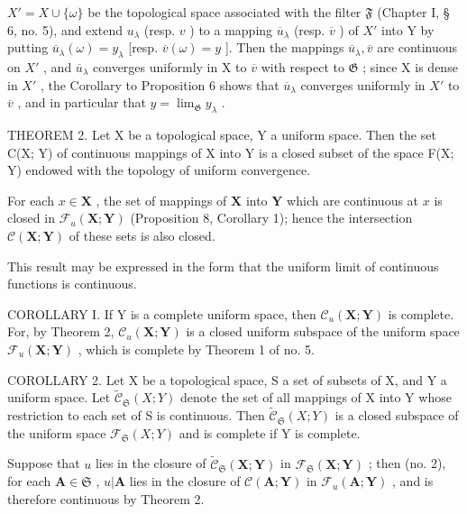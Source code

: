 \(X' = X \cup \{\omega\}\) be the topological space associated with the filter \(\mathfrak{F}\) (Chapter I, § 6, no. 5), and extend \(u_{\lambda}\) (resp. \(v\) ) to a mapping \(\overline{u}_{\lambda}\) (resp. \(\overline{v}\) ) of \(X'\) into Y by putting \(\overline{u}_{\lambda}(\omega) = y_{\lambda}\) {[}resp. \(\overline{v}(\omega) = y\) {]}. Then the mappings \(\overline{u}_{\lambda}, \overline{v}\) are continuous on \(X'\) , and \(\overline{u}_{\lambda}\) converges uniformly in X to \(\overline{v}\) with respect to \(\mathfrak{G}\) ; since X is dense in \(X'\) , the Corollary to Proposition 6 shows that \(\overline{u}_{\lambda}\) converges uniformly in \(X'\) to \(\overline{v}\) , and in particular that \(y = \lim_{\mathfrak{G}} y_{\lambda}\) .

THEOREM 2. Let X be a topological space, Y a uniform space. Then the set C(X; Y) of continuous mappings of X into Y is a closed subset of the space F(X; Y) endowed with the topology of uniform convergence.

For each \(x \in \mathbf{X}\) , the set of mappings of \(\mathbf{X}\) into \(\mathbf{Y}\) which are continuous at \(x\) is closed in \(\mathcal{F}_u(\mathbf{X};\mathbf{Y})\) (Proposition 8, Corollary 1); hence the intersection \(\mathcal{C}(\mathbf{X};\mathbf{Y})\) of these sets is also closed.

This result may be expressed in the form that the uniform limit of continuous functions is continuous.

COROLLARY I. If Y is a complete uniform space, then \(\mathcal{C}_{u}(\mathbf{X};\mathbf{Y})\) is complete. For, by Theorem 2, \(\mathcal{C}_{u}(\mathbf{X};\mathbf{Y})\) is a closed uniform subspace of the uniform space \(\mathcal{F}_{u}(\mathbf{X};\mathbf{Y})\) , which is complete by Theorem 1 of no. 5.

COROLLARY 2. Let X be a topological space, S a set of subsets of X, and Y a uniform space. Let \(\tilde{\mathcal{C}}_{\mathfrak{S}}(X;Y)\) denote the set of all mappings of X into Y whose restriction to each set of S is continuous. Then \(\tilde{\mathcal{C}}_{\mathfrak{S}}(X;Y)\) is a closed subspace of the uniform space \(\mathcal{F}_{\mathfrak{S}}(X;Y)\) and is complete if Y is complete.

Suppose that \(u\) lies in the closure of \(\tilde{\mathcal{C}}_{\mathfrak{S}}(\mathbf{X};\mathbf{Y})\) in \(\mathcal{F}_{\mathfrak{S}}(\mathbf{X};\mathbf{Y})\) ; then (no. 2), for each \(\mathbf{A} \in \mathfrak{S}\) , \(u|\mathbf{A}\) lies in the closure of \(\mathcal{C}(\mathbf{A};\mathbf{Y})\) in \(\mathcal{F}_u(\mathbf{A};\mathbf{Y})\) , and is therefore continuous by Theorem 2.

